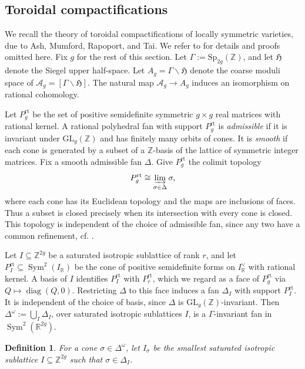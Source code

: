 \documentclass[12 pt]{amsart}
\newcommand{\fH}{\mathfrak H}
\newcommand{\RR}{\mathbb{R}}
\newcommand{\ZZ}{\mathbb{Z}}
\newcommand{\cA}{\mathcal{A}}
\newcommand{\Sp}{\mathrm{Sp}}
\newcommand{\Sym}{\operatorname{Sym}}
\newcommand{\GL}{\mathrm{GL}}
\newcommand{\rt}{\mathrm{rt}}
\newcommand{\<}{\langle}
\renewcommand{\>}{\rangle}
\newtheorem{definition}[theorem]{Definition}
\theoremstyle{definition}
\begin{document}
\subsection{Toroidal compactifications}\label{sec:toroidal-background}\label{sec:AMRT-tropicalizations}\label{sec:neat-level-covers}

We recall the theory of toroidal compactifications of locally symmetric varieties, due to Ash, Mumford, Rapoport, and Tai. We refer to \cite{AMRT} for details and proofs omitted here. Fix $g$ for the rest of this section. Let $\Gamma := \Sp_{2g}(\ZZ)$, and let $\fH$ denote the Siegel upper half-space. Let $A_g = \Gamma \backslash \fH$ denote the coarse moduli space of $\cA_g = [\Gamma \backslash \fH]$. The natural map $\cA_g \to A_g$ induces an isomorphism on rational cohomology.

Let $P_g^\rt$ be the set of positive semidefinite symmetric $g \times g$ real matrices with rational kernel. A rational polyhedral fan with support $P_g^\rt$ is \emph{admissible} if it is invariant under $\GL_g(\ZZ)$ and has finitely many orbits of cones. It is \emph{smooth} if each cone is generated by a subset of a $\ZZ$-basis of the lattice of symmetric integer matrices. Fix a smooth admissible fan $\Delta$. Give $P_g^\rt$ the colimit topology
\[
P_g^\rt \cong \varinjlim_{\sigma \in \Delta} \sigma,
\]
where each cone has its Euclidean topology and the maps are inclusions of faces. Thus a subset is closed precisely when its intersection with every cone is closed. This topology is independent of the choice of admissible fan, since any two have a common refinement, cf. \cite[Remark~3.2]{BBCMMW}.

Let $I \subseteq \ZZ^{2g}$ be a saturated isotropic sublattice of rank $r$, and let $P_I^\rt \subseteq \Sym^2(I_\RR)$ be the cone of positive semidefinite forms on $I_\RR^\vee$ with rational kernel. A basis of $I$ identifies $P_I^\rt$ with $P_r^\rt$, which we regard as a face of $P_g^\rt$ via $Q \mapsto \operatorname{diag}(Q, 0)$. Restricting $\Delta$ to this face induces a fan $\Delta_I$ with support $P_I^\rt$. It is independent of the choice of basis, since $\Delta$ is $\GL_g(\ZZ)$-invariant. Then $\Delta^\omega := \bigcup_I \Delta_I$, over saturated isotropic sublattices $I$, is a $\Gamma$-invariant fan in $\Sym^2(\RR^{2g})$. 

\begin{definition}\label{def:I-sigma}
For a cone $\sigma \in \Delta^\omega$, let $I_\sigma$ be the smallest saturated isotropic sublattice $I \subseteq \ZZ^{2g}$ such that $\sigma \in \Delta_I$.
\end{definition}
\end{document}
